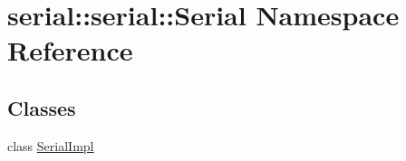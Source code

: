 \hypertarget{namespaceserial_1_1serial_1_1_serial}{}\section{serial\+:\+:serial\+:\+:Serial Namespace Reference}
\label{namespaceserial_1_1serial_1_1_serial}
\subsection*{Classes}
\begin{DoxyCompactItemize}
\item 
class \mbox{\hyperlink{classserial_1_1serial_1_1_serial_1_1_serial_impl}{Serial\+Impl}}
\end{DoxyCompactItemize}
